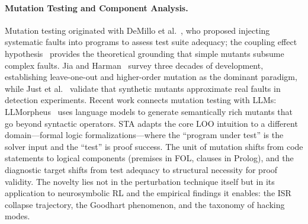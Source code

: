 \paragraph{Mutation Testing and Component Analysis.}
Mutation testing originated with DeMillo et al.~\cite{demillo1978}, who proposed injecting systematic faults into programs to assess test suite adequacy; the coupling effect hypothesis~\cite{offutt-coupling} provides the theoretical grounding that simple mutants subsume complex faults.
Jia and Harman~\cite{jia-harman-survey} survey three decades of development, establishing leave-one-out and higher-order mutation as the dominant paradigm, while Just et al.~\cite{just-mutants-real-faults} validate that synthetic mutants approximate real faults in detection experiments.
Recent work connects mutation testing with LLMs: LLMorpheus~\cite{llmorpheus} uses language models to generate semantically rich mutants that go beyond syntactic operators.
STA adapts the core LOO intuition to a different domain---formal logic formalizations---where the ``program under test'' is the solver input and the ``test'' is proof success.
The unit of mutation shifts from code statements to logical components (premises in FOL, clauses in Prolog), and the diagnostic target shifts from test adequacy to structural necessity for proof validity.
The novelty lies not in the perturbation technique itself but in its application to neurosymbolic RL and the empirical findings it enables: the ISR collapse trajectory, the Goodhart phenomenon, and the taxonomy of hacking modes.

